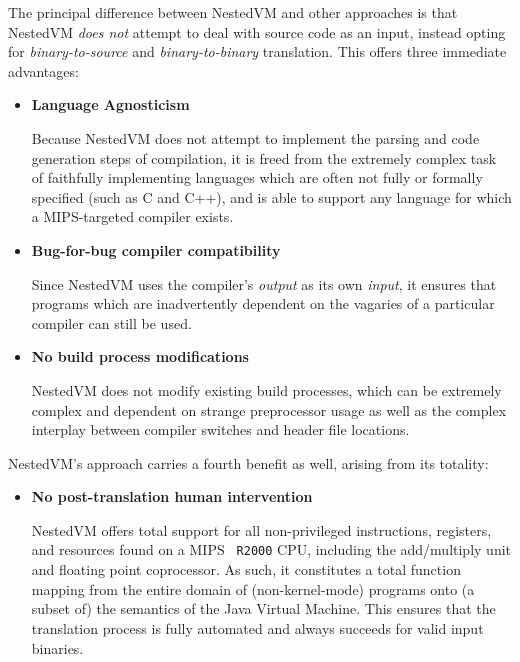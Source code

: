 \documentclass{acmconf}
\begin{document}
The principal difference between NestedVM and other approaches is that
NestedVM {\it does not} attempt to deal with source code as an input,
instead opting for {\it binary-to-source} and {\it binary-to-binary}
translation.  This offers three immediate advantages:

\begin{itemize}
\item {\bf Language Agnosticism}

      Because NestedVM does not attempt to implement the parsing and
      code generation steps of compilation, it is freed from the
      extremely complex task of faithfully implementing languages
      which are often not fully or formally specified (such as C and
      C++), and is able to support any language for which a
      MIPS-targeted compiler exists.

\item {\bf Bug-for-bug compiler compatibility}

      Since NestedVM uses the compiler's {\it output} as its own {\it
      input}, it ensures that programs which are inadvertently
      dependent on the vagaries of a particular compiler can still be
      used.

\item {\bf No build process modifications}

      NestedVM does not modify existing build processes, which can be
      extremely complex and dependent on strange preprocessor usage as
      well as the complex interplay between compiler switches and
      header file locations.

\end{itemize}

NestedVM's approach carries a fourth benefit as well, arising from its
totality:

\begin{itemize}
\item {\bf No post-translation human intervention}

      NestedVM offers total support for all non-privileged
      instructions, registers, and resources found on a MIPS {\tt
      R2000} CPU, including the add/multiply unit and floating point
      coprocessor.  As such, it constitutes a total function mapping
      from the entire domain of (non-kernel-mode) programs onto (a
      subset of) the semantics of the Java Virtual Machine.  This
      ensures that the translation process is fully automated and
      always succeeds for valid input binaries.
\end{itemize}
\end{document}
